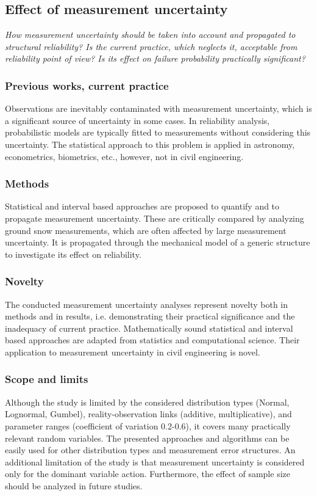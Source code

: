 \subsection{Effect of measurement uncertainty}

\textit{How measurement uncertainty should be taken into account and propagated to structural reliability? Is the current practice, which neglects it, acceptable from reliability point of view? Is its effect on failure probability practically significant?}

\subsubsection{Previous works, current practice}
Observations are inevitably contaminated with measurement uncertainty, which is a significant source of uncertainty in some cases. In reliability analysis, probabilistic models are typically fitted to measurements without considering this uncertainty. The statistical approach to this problem is applied in astronomy, econometrics, biometrics, etc., however, not in civil engineering.

\subsubsection{Methods}
Statistical and interval based approaches are proposed to quantify and to propagate measurement uncertainty. These are critically compared by analyzing ground snow measurements, which are often affected by large measurement uncertainty. It is propagated through the mechanical model of a generic structure to investigate its effect on reliability.

\subsubsection{Novelty}
The conducted measurement uncertainty analyses represent novelty both in methods and in results, i.e. demonstrating their practical significance and the inadequacy of current practice. Mathematically sound statistical and interval based approaches are adapted from statistics and computational science. Their application to measurement uncertainty in civil engineering is novel.

\subsubsection{Scope and limits}
Although the study is limited by the considered distribution types (Normal, Lognormal, Gumbel), reality-observation links (additive, multiplicative), and parameter ranges (coefficient of variation 0.2-0.6), it covers many practically relevant random variables. The presented approaches and algorithms can be easily used for other distribution types and measurement error structures. An additional limitation of the study is that measurement uncertainty is considered only for the dominant variable action. Furthermore, the effect of sample size should be analyzed in future studies.

